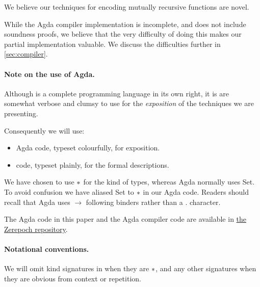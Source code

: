 We believe our techniques for encoding mutually recursive functions are novel.

While the Agda compiler implementation is incomplete, and does not include soundness
proofs, we believe that the very difficulty of doing this makes our partial
implementation valuable. We discuss the difficulties further in \cref{sec:compiler}.

\paragraph{Note on the use of Agda.}

Although \FOMF{} is a complete programming language in its own
right, it is are somewhat verbose and clumsy to use for the \emph{exposition} of the
techniques we are presenting.

Consequently we will use:
\begin{itemize}
  \item Agda code, typeset colourfully, for exposition.
  \item \FOMF{} code, typeset plainly, for the formal descriptions.
\end{itemize}

We have chosen to use $\operatorname{\ast}$ for the kind of types, whereas Agda normally
uses Set. To avoid confusion we have aliased Set to $\operatorname{\ast}$ in our Agda code.
Readers should recall that Agda uses $\rightarrow$ following binders rather than
a $.$ character.

The Agda code in this paper and the Agda compiler code are available in
\href{\sourceUrl}{the Zerepoch repository}.

\paragraph{Notational conventions.}

We will omit kind signatures in \FOMF{} when they are $\operatorname{\ast}$, and any other signatures when
they are obvious from context or repetition.

